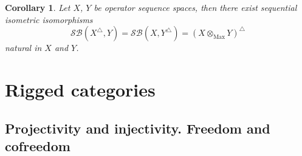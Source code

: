 \documentclass[12pt]{article}
\newtheorem{corollary}[theorem]{Corollary}
\begin{document}
\begin{corollary}\label{CorSQUnivPropMaxTenProd}
Let $X$, $Y$ be operator sequence spaces, then there exist sequential 
isometric isomorphisms
$$
\mathcal{SB}(X^\triangle,Y)
=\mathcal{SB}(X,Y^\triangle)
={(X\otimes_{\operatorname{Max}} Y)}^\triangle
$$
natural in $X$ and $Y$. 
\end{corollary}































\section{Rigged categories}

\subsection{Projectivity and injectivity. Freedom and cofreedom}
\end{document}
